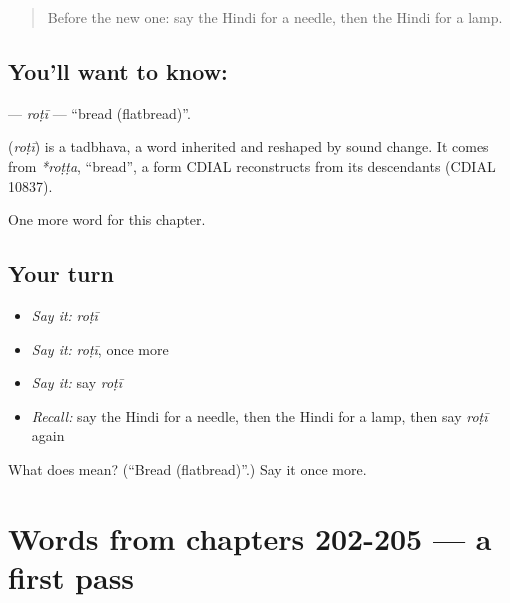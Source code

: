 \label{lesson:HI-C209-roti}



\begin{quote}
Before the new one: say the Hindi for a needle, then the Hindi for a lamp.
\end{quote}

\subsection*{You'll want to know: }
\textbf{} — \emph{roṭī} — \textquotedblleft{}bread (flatbread)\textquotedblright{}.

\begin{cousinweb}
\textbf{} (\emph{roṭī}) is a tadbhava, a word inherited and reshaped by sound change. It comes from \emph{*roṭṭa}, \textquotedblleft{}bread\textquotedblright{}, a form CDIAL reconstructs from its descendants (CDIAL 10837).
\end{cousinweb}

\begin{grammarlens}[title={What you've built}]
One more word for this chapter.
\end{grammarlens}

\subsection*{Your turn}
\begin{itemize}
\raggedright
  \item \emph{Say it:} \emph{roṭī}
  \item \emph{Say it:} \emph{roṭī}, once more
  \item \emph{Say it:} say \emph{roṭī}
  \item \emph{Recall:} say the Hindi for a needle, then the Hindi for a lamp, then say \emph{roṭī} again
\end{itemize}

\begin{tcolorbox}[breakable,colback=teal!4,colframe=teal!35!black,title={Before you move on}]
What does  mean? (\textquotedblleft{}Bread (flatbread)\textquotedblright{}.) Say it once more.
\end{tcolorbox}
\section[(dialogue)]{Words from chapters 202-205 — a first pass}

\label{lesson:HI-R209-first-pass-words-from-chapters-202-205}



